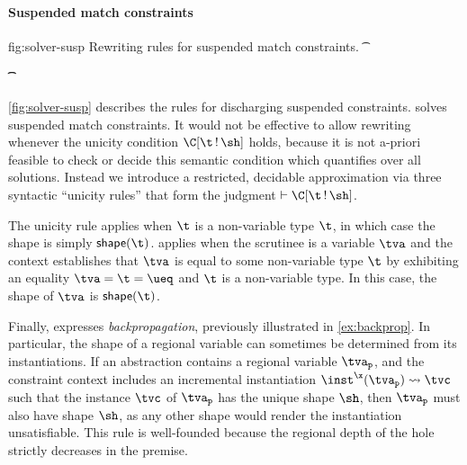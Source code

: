 \documentclass[acmsmall,screen,nonacm%
\Anonymous{,anonymous}{}%
\Final{}{,review}%
]{acmart}
\begin{document}
\paragraph{Suspended match constraints}

\begin{mathparfig}[tp]
  {fig:solver-susp}
  {Rewriting rules for suspended match constraints.}
  {\th \Cshape \C \t \sh}
  {\C\where{\cmatched \t {\sh} \cbrs}}

  {\th \Cshape {\Ca\where{\cunif \tv
     {\cunif \t \ueq} \cand \Cb\where{\hole}}} \tv {\shape \t}}

  {\th \Cshape \C \t {\shape \t}}

  {\th \Cshape
     {\parens{\cletr \x \tv \tvs {\Ca\where{\hole}}
                  {\Cb\where{\cpapp \x \tvp \tvc \inst}}}}
     \tvp \sh}
\end{mathparfig}

\cref{fig:solver-susp} describes the rules for discharging suspended
constraints.
%
%
\break {} solves suspended
match constraints. It would not be effective to allow rewriting whenever the
unicity condition $\Cshape \C \t \sh$ holds, because it is not a-priori
feasible to check or decide this semantic condition which quantifies over all
solutions. Instead we introduce a restricted, decidable approximation via
 three syntactic ``unicity rules'' that form the judgment $\th \Cshape \C \t \sh$.

The unicity rule  applies when $\t$ is a non-variable type $\t$,
in which case the shape is simply $\shape \t$.  applies when the
scrutinee is a variable $\tv$ and the context establishes that $\tv$ is equal
to some non-variable type $\t$ by exhibiting an equality $\cunif \tv {\cunif \t
\ueq}$ and $\t$ is a non-variable type. In this case, the shape of $\tv$ is
$\shape \t$.

Finally,  expresses
\emph{backpropagation}, previously illustrated in \cref{ex:backprop}. In
particular, the shape of a regional variable can sometimes be determined
from its instantiations. If an abstraction contains a regional variable
$\tvp$, and the constraint context includes an incremental instantiation
$\cpapp \x \tvp \tvc \inst$ such that the instance $\tvc$ of $\tvp$ has
the unique shape $\sh$, then $\tvp$ must also have shape $\sh$, as any
other shape would render the instantiation unsatisfiable. This rule is
well-founded because the regional depth of the hole strictly decreases
in the premise.
\end{document}
